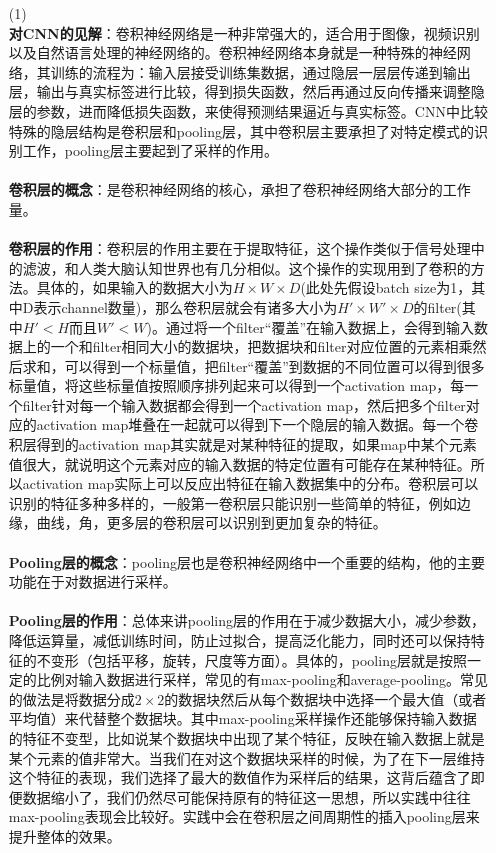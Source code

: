 \documentclass[a4paper,UTF8]{article}
\numberwithin{equation}{section}
\begin{document}
\begin{enumerate}
\item [(1)]
~\\
\textbf{对CNN的见解}：卷积神经网络是一种非常强大的，适合用于图像，视频识别以及自然语言处理的神经网络的。卷积神经网络本身就是一种特殊的神经网络，其训练的流程为：输入层接受训练集数据，通过隐层一层层传递到输出层，输出与真实标签进行比较，得到损失函数，然后再通过反向传播来调整隐层的参数，进而降低损失函数，来使得预测结果逼近与真实标签。CNN中比较特殊的隐层结构是卷积层和pooling层，其中卷积层主要承担了对特定模式的识别工作，pooling层主要起到了采样的作用。\\\\
\textbf{卷积层的概念}：是卷积神经网络的核心，承担了卷积神经网络大部分的工作量。\\\\
\textbf{卷积层的作用}：卷积层的作用主要在于提取特征，这个操作类似于信号处理中的滤波，和人类大脑认知世界也有几分相似。这个操作的实现用到了卷积的方法。具体的，如果输入的数据大小为$H\times W\times D$(此处先假设batch size为1，其中D表示channel数量)，那么卷积层就会有诸多大小为$H'\times W'\times D$的filter(其中$H' < H$而且$W' < W$)。通过将一个filter“覆盖”在输入数据上，会得到输入数据上的一个和filter相同大小的数据块，把数据块和filter对应位置的元素相乘然后求和，可以得到一个标量值，把filter“覆盖”到数据的不同位置可以得到很多标量值，将这些标量值按照顺序排列起来可以得到一个activation map，每一个filter针对每一个输入数据都会得到一个activation map，然后把多个filter对应的activation map堆叠在一起就可以得到下一个隐层的输入数据。每一个卷积层得到的activation map其实就是对某种特征的提取，如果map中某个元素值很大，就说明这个元素对应的输入数据的特定位置有可能存在某种特征。所以activation map实际上可以反应出特征在输入数据集中的分布。卷积层可以识别的特征多种多样的，一般第一卷积层只能识别一些简单的特征，例如边缘，曲线，角，更多层的卷积层可以识别到更加复杂的特征。\\\\
\textbf{Pooling层的概念}：pooling层也是卷积神经网络中一个重要的结构，他的主要功能在于对数据进行采样。\\\\
\textbf{Pooling层的作用}：总体来讲pooling层的作用在于减少数据大小，减少参数，降低运算量，减低训练时间，防止过拟合，提高泛化能力，同时还可以保持特征的不变形（包括平移，旋转，尺度等方面）。具体的，pooling层就是按照一定的比例对输入数据进行采样，常见的有max-pooling和average-pooling。常见的做法是将数据分成$2\times 2$的数据块然后从每个数据块中选择一个最大值（或者平均值）来代替整个数据块。其中max-pooling采样操作还能够保持输入数据的特征不变型，比如说某个数据块中出现了某个特征，反映在输入数据上就是某个元素的值非常大。当我们在对这个数据块采样的时候，为了在下一层维持这个特征的表现，我们选择了最大的数值作为采样后的结果，这背后蕴含了即便数据缩小了，我们仍然尽可能保持原有的特征这一思想，所以实践中往往max-pooling表现会比较好。实践中会在卷积层之间周期性的插入pooling层来提升整体的效果。
	

\end{enumerate}
\end{document}
